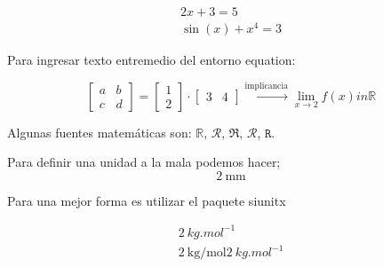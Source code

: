 \begin{gather} %
    2x+3=5 \\
    \sin(x) + x^4 = 3
\end{gather}

Para ingresar texto entremedio del entorno equation:

\begin{equation}
    \begin{bmatrix}
        a & b \\
        c & d
    \end{bmatrix}
    =
    \begin{bmatrix}
        1 \\
        2
    \end{bmatrix}
    \cdot
    \begin{bmatrix}
        3 & 4
    \end{bmatrix}
    \overset{\text{implicancia}}{\rightarrow}
    \lim_{x \to 2} f(x) in \mathbb{R}
\end{equation}

Algunas fuentes matemáticas son: $\mathbb{R}$, $\mathscr{R}$, $\mathfrak{R}$, $\mathcal{R}$, $\mathtt{R}$.

\newpage

Para definir una unidad a la mala podemos hacer;
\begin{equation}
    2 \ \text{mm}
\end{equation}

Para una mejor forma es utilizar el paquete siunitx

\begin{gather}
    2 \ \unit{kg.mol^{-1}} \\
    2 \ \unit{\kilogram\per\mole}
    \qty{2}{kg.mol^{-1}} %
\end{gather}